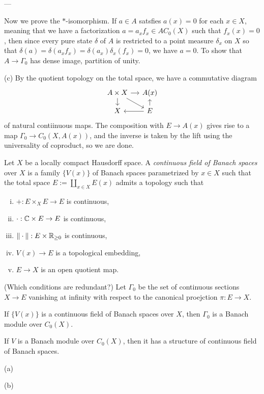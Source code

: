 \documentclass{../../large}
\begin{document}
\begin{pf}
---

Now we prove the $*$-isomorphism.
If $a\in A$ satsfies $a(x)=0$ for each $x\in X$, meaning that we have a factorization $a=a_xf_x\in AC_0(X)$ such that $f_x(x)=0$, then since every pure state $\delta$ of $A$ is restricted to a point measure $\delta_x$ on $X$ so that $\delta(a)=\delta(a_xf_x)=\delta(a_x)\delta_x(f_x)=0$, we have $a=0$.
To show that $A\to\Gamma_0$ has dense image,
partition of unity.

(c)
By the quotient topology on the total space, we have a commutative diagram
\[\begin{tikzcd}[sep=small]
A\times X \rar\dar\ar{dr} & A(x)\\
X & E \uar\lar
\end{tikzcd}\]
of natural contiinuous maps.
The composition with $E\to A(x)$ gives rise to a map $\Gamma_0\to C_0(X,A(x))$, and the inverse is taken by the lift using the universality of coproduct, so we are done.
\end{pf}




\begin{prb}
Let $X$ be a locally compact Hausdorff space.
A \emph{continuous field of Banach spaces} over $X$ is a family $\{V(x)\}$ of Banach spaces parametrized by $x\in X$ such that the total space $E:=\coprod_{x\in X}E(x)$ admits a topology such that
\begin{enumerate}[(i)]
\item $+:E\times_XE\to E$ is continuous,
\item $\cdot:\mathbb{C}\times E\to E$ is continuous,
\item $\|\cdot\|:E\times\mathbb{R}_{\ge0}$ is continuous,
\item $V(x)\to E$ is a topological embedding,
\item $E\to X$ is an open quotient map.
\end{enumerate}
(Which conditions are redundant?)
Let $\Gamma_0$ be the set of continuous sections $X\to E$ vanishing at infinity with respect to the canonical proejction $\pi:E\to X$.
\begin{parts}
\item If $\{V(x)\}$ is a continuous field of Banach spaces over $X$, then $\Gamma_0$ is a Banach module over $C_0(X)$.
\item If $V$ is a Banach module over $C_0(X)$, then it has a structure of continuous field of Banach spaces.
\end{parts}
\end{prb}
\begin{pf}
(a)


(b)


\end{pf}
\end{document}

